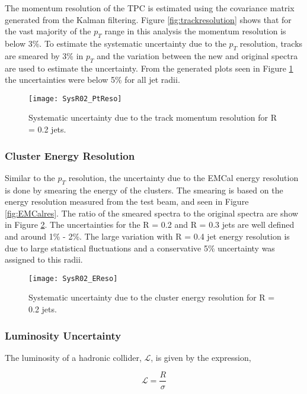 The momentum resolution of the TPC is estimated using the covariance matrix generated from the Kalman filtering\cite{Fruhwirth:1987fm}.  Figure \ref{fig:trackresolution} shows that for the vast majority of the $p_{T}$ range in this analysis the  momentum resolution is below 3\%.  To estimate the systematic uncertainty due to the $p_{T}$ resolution, tracks are smeared by 3\% in $p_{T}$ and the variation between the new and original spectra are used to estimate the uncertainty.  From the generated plots seen in Figure \ref{fig:pTeff} the uncertainties were below 5\% for all jet radii.

\begin{figure}[h!]
\texttt{[image: SysR02\_PtReso]}
\centering
\caption{Systematic uncertainty due to the track momentum resolution for R = 0.2 jets.}
\label{fig:pTeff}
\end{figure}

\subsubsection{Cluster Energy Resolution}

Similar to the $p_{T}$ resolution, the uncertainty due to the EMCal energy resolution is done by smearing the energy of the clusters.  The smearing is based on the energy resolution measured from the test beam, and seen in Figure \ref{fig:EMCalres}.  The ratio of the smeared spectra to the original spectra are show in Figure \ref{fig:Eeff}. The uncertainties for the R = 0.2 and R = 0.3 jets are well defined and around 1\% - 2\%.  The large variation with R = 0.4 jet energy resolution is due to large statistical fluctuations and a conservative 5\% uncertainty was assigned to this radii.

\begin{figure}[t!]
\texttt{[image: SysR02\_EReso]}
\centering
\caption{Systematic uncertainty due to the cluster energy resolution for R = 0.2 jets.}
\label{fig:Eeff}
\end{figure}


\subsubsection{Luminosity Uncertainty}

The luminosity of a hadronic collider, $\mathscr{L}$, is given by the expression,



\begin{equation}
\mathscr{L} = \frac{R}{\sigma}
\label{eq:xlumdef}
\end{equation}

